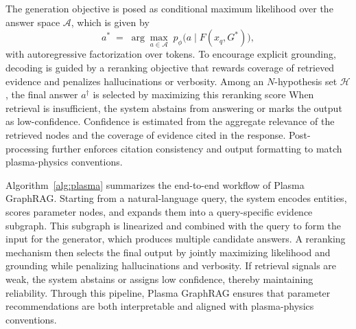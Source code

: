 \documentclass[journal]{IEEEtran}
\begin{document}
The generation objective is posed as conditional maximum likelihood over the answer space $\mathcal{A}$, which is given by
\begin{equation}
a^{\ast} \;=\; \arg\max_{a \in \mathcal{A}} \; p_{\phi}\!\bigl(a \mid F(x_q, G^{\ast})\bigr),
\label{eq:gen_objective}
\end{equation}
with autoregressive factorization over tokens. To encourage explicit grounding, decoding is guided by a reranking objective that rewards coverage of retrieved evidence and penalizes hallucinations or verbosity. Among an $N$-hypothesis set $\mathcal{H}$, the final answer $a^{\dagger}$ is selected by maximizing this reranking score \cite{zhao2024retrieval} When retrieval is insufficient, the system abstains from answering or marks the output as low-confidence. Confidence is estimated from the aggregate relevance of the retrieved nodes and the coverage of evidence cited in the response. Post-processing further enforces citation consistency and output formatting to match plasma-physics conventions.

Algorithm~\ref{alg:plasma} summarizes the end-to-end workflow of Plasma GraphRAG. 
Starting from a natural-language query, the system encodes entities, scores parameter nodes, and expands them into a query-specific evidence subgraph. 
This subgraph is linearized and combined with the query to form the input for the generator, which produces multiple candidate answers. 
A reranking mechanism then selects the final output by jointly maximizing likelihood and grounding while penalizing hallucinations and verbosity. 
If retrieval signals are weak, the system abstains or assigns low confidence, thereby maintaining reliability. 
Through this pipeline, Plasma GraphRAG ensures that parameter recommendations are both interpretable and aligned with plasma-physics conventions.
\end{document}

